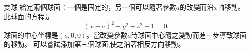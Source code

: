 \begin{surferPage}{雙球}
給定兩個球面：一個是固定的，另一個可以隨著參數$a$的改變而沿$x$軸移動。
此球面的方程是
\[(x-a)^2+y^2+z^2-1=0.\]
球面的中心坐標是$(a,0,0)$。當改變參數$a$時球面中心隨之變動而進一步導致球面的移動。
可以嘗試添加第三個球面,使之沿著相反方向移動。
\end{surferPage}
